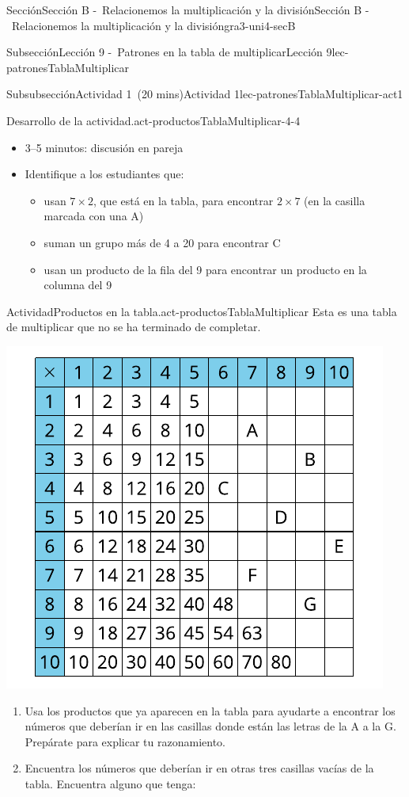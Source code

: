 \documentclass[oneside,10pt,]{article}
\begin{document}
\begin{sectionptx}{Sección}{Sección B -~Relacionemos la multiplicación y la división}{}{Sección B -~Relacionemos la multiplicación y la división}{}{}{gra3-uni4-secB}
\begin{subsectionptx}{Subsección}{Lección 9 -~Patrones en la tabla de multiplicar}{}{Lección 9}{}{}{lec-patronesTablaMultiplicar}
\begin{subsubsectionptx}{Subsubsección}{Actividad 1~(20 mins)}{}{Actividad 1}{}{}{lec-patronesTablaMultiplicar-act1}
\begin{paragraphs}{Desarrollo de la actividad.}{act-productosTablaMultiplicar-4-4}
\begin{itemize}[label=\textbullet]
\item{}3–5 minutos: discusión en pareja%
\item{}Identifique a los estudiantes que:%
%
\begin{itemize}[label=$\circ$]
\item{}usan \(7\times 2\), que está en la tabla, para encontrar \(2\times 7\) (en la casilla marcada con una A)%
\item{}suman un grupo más de 4 a 20 para encontrar C%
\item{}usan un producto de la fila del 9 para encontrar un producto en la columna del 9%
\end{itemize}
\end{itemize}
\end{paragraphs}%
\begin{activity}{Actividad}{Productos en la tabla.}{act-productosTablaMultiplicar}%
Esta es una tabla de multiplicar que no se ha terminado de completar.%
\begin{image}{0}{1}{0}{}%
\includegraphics[width=\linewidth]{external/svg-source/tikz-file-152978-scale13.pdf}
\end{image}%
%
\begin{enumerate}
\item{}Usa los productos que ya aparecen en la tabla para ayudarte a encontrar los números que deberían ir en las casillas donde están las letras de la A a la G. Prepárate para explicar tu razonamiento.%
\item{}Encuentra los números que deberían ir en otras tres casillas vacías de la tabla. Encuentra alguno que tenga:%

\end{enumerate}
\end{activity}
\end{subsubsectionptx}
\end{subsectionptx}
\end{sectionptx}
\end{document}
